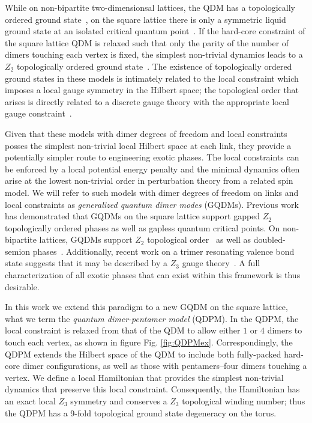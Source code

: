 \documentclass[twocolumn,prb,aps,floatfix,superscriptaddress]{revtex4-1}
\newcommand{\figref}[1]{Fig. \ref{#1}}
\begin{document}
While on non-bipartite two-dimensionsal lattices, the QDM has a topologically ordered ground state~\cite{Moessner2001a,Fendley2002}, on the square lattice there is only a symmetric liquid ground state at an isolated critical quantum point~\cite{Leung1996,Syljuasen2006}. If the hard-core constraint of the square lattice QDM is relaxed such that only the parity of the number of dimers touching each vertex is fixed, the simplest non-trivial dynamics leads to a $Z_2$ topologically ordered ground state~\cite{Kitaev2003,Wen2003}. The existence of topologically ordered ground states in these models is intimately related to the local constraint which imposes a local gauge symmetry in the Hilbert space; the topological order that arises is directly related to a discrete gauge theory with the appropriate local gauge constraint~\cite{Moessner2001}.

Given that these models with dimer degrees of freedom and local constraints posses the simplest non-trivial local Hilbert space at each link, they provide a potentially simpler route to engineering exotic phases. The local constraints can be enforced by a local potential energy penalty and the minimal dynamics often arise at the lowest non-trivial order in perturbation theory from a related spin model\cite{Albuquerque2008}. We will refer to such models with dimer degrees of freedom on links and local constraints as \emph{generalized quantum dimer modes} (GQDMs). Previous work has demonstrated that GQDMs on the square lattice support gapped $Z_2$ topologically ordered phases as well as gapless quantum critical points. On non-bipartite lattices, GQDMs support $Z_2$ topological order~\cite{Moessner2001a,Misguich2002} as well as doubled-semion phases~\cite{Qi2015,Buerschaper2014}. Additionally, recent work on a trimer resonating valence bond state suggests that it may be described by a $Z_3$ gauge theory~\cite{Lee2017}. A full characterization of all exotic phases that can exist within this framework is thus desirable.

In this work we extend this paradigm to a new GQDM on the square lattice, what we term the \emph{quantum dimer-pentamer model} (QDPM). In the QDPM, the local constraint is relaxed from that of the QDM to allow either $1$ or $4$ dimers to touch each vertex, as shown in figure \figref{fig:QDPMex}. Correspondingly, the QDPM extends the Hilbert space of the QDM to include both fully-packed hard-core dimer configurations, as well as those with pentamers--four dimers touching a vertex. We define a local Hamiltonian that provides the simplest non-trivial dynamics that preserve this local constraint. Consequently, the Hamiltonian has an exact local $Z_3$ symmetry and conserves a $Z_3$ topological winding number; thus the QDPM has a 9-fold topological ground state degeneracy on the torus.
\end{document}
